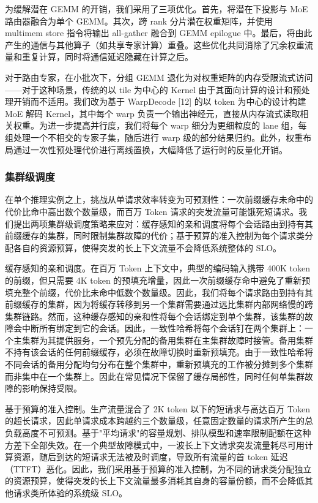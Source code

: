 \documentclass[
  10
]{article}
\begin{document}
为缓解潜在 GEMM 的开销，我们采用了三项优化。首先，将潜在下投影与 MoE 路由器融合为单个 GEMM。其次，跨 rank 分片潜在权重矩阵，并使用 multimem store 指令将输出 all-gather 融合到 GEMM epilogue 中。最后，将由此产生的通信与其他算子（如共享专家计算）重叠。这些优化共同消除了冗余权重流量和重复计算，同时将通信延迟隐藏在计算之后。

对于路由专家，在小批次下，分组 GEMM 退化为对权重矩阵的内存受限流式访问——对于这种场景，传统的以 tile 为中心的 Kernel 由于其面向计算的设计和预处理开销而不适用。我们改为基于 WarpDecode {[}12{]} 的以 token 为中心的设计构建 MoE 解码 Kernel，其中每个 warp 负责一个输出神经元，直接从内存流式读取相关权重。为进一步提高并行度，我们将每个 warp 细分为更细粒度的 lane 组，每组处理一个不相交的专家子集，随后进行 warp 级的部分结果归约。此外，权重布局通过一次性预处理代价进行离线置换，大幅降低了运行时的反量化开销。

\subsubsection{集群级调度}\label{fleet-level-scheduling}

在单个推理实例之上，挑战从单请求效率转变为可预测性：一次前缀缓存未命中的代价比命中高出数个数量级，而百万 Token 请求的突发流量可能饿死短请求。我们提出两项集群级调度策略来应对：缓存感知的亲和调度将每个会话路由到持有其前缀缓存的集群，同时限制集群故障的代价；基于预算的准入控制为每个请求类分配各自的资源预算，使得突发的长上下文流量不会降低系统整体的 SLO。

缓存感知的亲和调度。在百万 Token 上下文中，典型的编码输入携带 400K token 的前缀，但只需要 4K token 的预填充增量，因此一次前缀缓存命中避免了重新预填充整个前缀，代价比未命中低数个数量级。因此，我们将每个请求路由到持有其前缀缓存的集群，因为将缓存转移到另一个集群需要通过远比集群内部网络慢的跨集群链路。然而，这种缓存感知的亲和性将每个会话绑定到单个集群，该集群的故障会中断所有绑定到它的会话。因此，一致性哈希将每个会话钉在两个集群上：一个主集群为其提供服务，一个预先分配的备用集群在主集群故障时接管。备用集群不持有该会话的任何前缀缓存，必须在故障切换时重新预填充。由于一致性哈希将不同会话的备用分配均匀分布在整个集群中，重新预填充的工作被分摊到多个集群而非集中在一个集群上。因此在常见情况下保留了缓存局部性，同时任何单集群故障的影响保持受限。

基于预算的准入控制。生产流量混合了 2K token 以下的短请求与高达百万 Token 的超长请求，因此单请求成本跨越约三个数量级，任意固定数量的请求所产生的总负载高度不可预测。基于"平均请求"的容量规划、排队模型和速率限制配额在这种方差下全部失效。在一个典型故障模式中，一波长上下文请求突发流量耗尽可用计算资源，随后到达的短请求无法被及时调度，导致所有流量的首 token 延迟（TTFT）恶化。因此，我们采用基于预算的准入控制，为不同的请求类分配独立的资源预算，使得突发的长上下文流量最多消耗其自身的容量份额，而不会降低其他请求类所体验的系统级 SLO。
\end{document}
